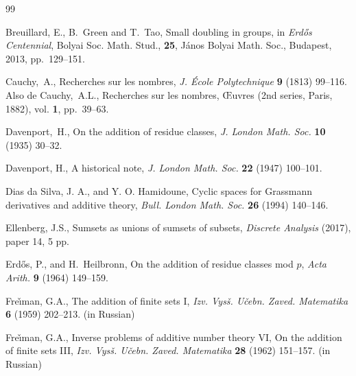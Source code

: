 \documentclass[12pt,reqno]{amsart}
\theoremstyle{definition}
\begin{document}
\begin{thebibliography}{99}


Breuillard, E., B.~Green and T.~Tao,
Small doubling in groups, in {\em Erd\H{o}s Centennial},  Bolyai Soc. Math. Stud., {\bf 25}, J\'anos Bolyai Math. Soc., Budapest, 2013, pp.~129--151.


Cauchy,~A., Recherches sur les nombres, {\em J. \'Ecole Polytechnique} {\bf 9} (1813) 99--116. Also de Cauchy,~A.L., Recherches sur les nombres, {\OE}uvres (2nd series, Paris, 1882), vol. {\bf 1}, pp.~39--63.



Davenport,~H., On the addition of residue classes, {\em J. London Math. Soc.} {\bf 10} (1935)
30--32.

Davenport, H., A historical note, {\em J. London Math. Soc.} {\bf 22} (1947) 100--101.


Dias da Silva, J. A., and Y. O. Hamidoune,
Cyclic spaces for Grassmann derivatives and additive theory,
{\em Bull. London Math. Soc.} {\bf 26} (1994) 140--146.

  Ellenberg, J.S., Sumsets as unions of sumsets of subsets,
  {\em Discrete Analysis} (2017), paper 14, 5 pp.

Erd\H{o}s, P., and H.~Heilbronn,
On the addition of residue classes mod $p$,
{\em Acta Arith.} {\bf 9} (1964) 149--159.



Fre\v{\i}man, G.A., The addition of finite sets I,  {\em Izv. Vys\v{s}. U\v{c}ebn. Zaved. Matematika} {\bf 6} (1959)  202--213. (in Russian)


Fre\v{\i}man, G.A.,
Inverse problems of additive number theory VI, On the addition of finite sets III,  {\em Izv. Vys\v{s}. U\v{c}ebn. Zaved. Matematika} {\bf 28} (1962) 151--157. (in Russian)



\end{thebibliography}
\end{document}
